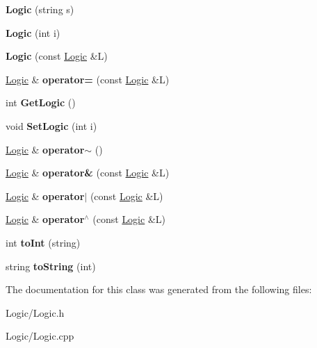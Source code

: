 \begin{DoxyCompactItemize}
\item 
\hypertarget{class_logic_a68954cc29f76f2bf6cca7b32adc9552a}{}{\bfseries Logic} (string s)\label{class_logic_a68954cc29f76f2bf6cca7b32adc9552a}

\item 
\hypertarget{class_logic_afdfc186dfdae286243c5cc0fb8c2bfc8}{}{\bfseries Logic} (int i)\label{class_logic_afdfc186dfdae286243c5cc0fb8c2bfc8}

\item 
\hypertarget{class_logic_a038eed90bb481df728efeb289e3ee49d}{}{\bfseries Logic} (const \hyperlink{class_logic}{Logic} \&L)\label{class_logic_a038eed90bb481df728efeb289e3ee49d}

\item 
\hypertarget{class_logic_a8b6abb099b270ff556d660482b1dbc45}{}\hyperlink{class_logic}{Logic} \& {\bfseries operator=} (const \hyperlink{class_logic}{Logic} \&L)\label{class_logic_a8b6abb099b270ff556d660482b1dbc45}

\item 
\hypertarget{class_logic_afd438812fa5e11470f900962ed35a03d}{}int {\bfseries Get\+Logic} ()\label{class_logic_afd438812fa5e11470f900962ed35a03d}

\item 
\hypertarget{class_logic_aa9ce5cce754e20e0a7c0ac9a3ae66629}{}void {\bfseries Set\+Logic} (int i)\label{class_logic_aa9ce5cce754e20e0a7c0ac9a3ae66629}

\item 
\hypertarget{class_logic_a3837982951d720fcbd4c40edfa4d04bf}{}\hyperlink{class_logic}{Logic} \& {\bfseries operator$\sim$} ()\label{class_logic_a3837982951d720fcbd4c40edfa4d04bf}

\item 
\hypertarget{class_logic_a13ed9fa2084d12dbf7194a142d1fbcf6}{}\hyperlink{class_logic}{Logic} \& {\bfseries operator\&} (const \hyperlink{class_logic}{Logic} \&L)\label{class_logic_a13ed9fa2084d12dbf7194a142d1fbcf6}

\item 
\hypertarget{class_logic_a0ee44e200f02d23a34b9f84d42125aa6}{}\hyperlink{class_logic}{Logic} \& {\bfseries operator$\vert$} (const \hyperlink{class_logic}{Logic} \&L)\label{class_logic_a0ee44e200f02d23a34b9f84d42125aa6}

\item 
\hypertarget{class_logic_a80bb6d4a5321494eaaee00f84e4b669b}{}\hyperlink{class_logic}{Logic} \& {\bfseries operator$^\wedge$} (const \hyperlink{class_logic}{Logic} \&L)\label{class_logic_a80bb6d4a5321494eaaee00f84e4b669b}

\item 
\hypertarget{class_logic_a2c4be19b8faf7982cfe5a658d3621c8d}{}int {\bfseries to\+Int} (string)\label{class_logic_a2c4be19b8faf7982cfe5a658d3621c8d}

\item 
\hypertarget{class_logic_adfebd6cf72df68d970e6a404859195b0}{}string {\bfseries to\+String} (int)\label{class_logic_adfebd6cf72df68d970e6a404859195b0}

\end{DoxyCompactItemize}


The documentation for this class was generated from the following files\+:\begin{DoxyCompactItemize}
\item 
Logic/Logic.\+h\item 
Logic/Logic.\+cpp\end{DoxyCompactItemize}
